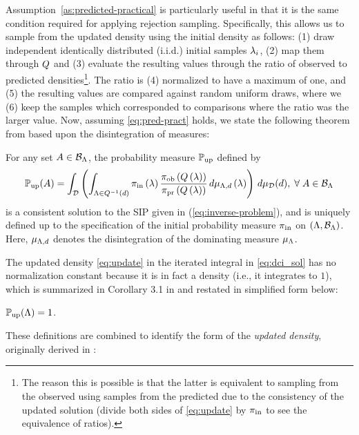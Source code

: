 Assumption~\ref{as:predicted-practical} is particularly useful in that it is the same condition required for applying rejection sampling.
Specifically, this allows us to sample from the updated density using the initial density as follows:
(1) draw independent identically distributed (i.i.d.) initial samples $\lambda_i$, (2) map them through $Q$ and (3) evaluate the resulting values through the ratio of observed to predicted densities\footnote{The reason this is possible is that the latter is equivalent to sampling from the observed using samples from the predicted due to the consistency of the updated solution (divide both sides of \eqref{eq:update} by $\operatorname*{\pi_{in}}$ to see the equivalence of ratios).}. The ratio is (4) normalized to have a maximum of one, and (5) the resulting values are compared against random uniform draws, where we (6) keep the samples which corresponded to comparisons where the ratio was the larger value.
Now, assuming \eqref{eq:pred-pract} holds, we state the following theorem from \cite{BJW18} based upon the disintegration of measures:


\begin{thm}
  For any set $A\in \mathcal{B}_{{\Lambda}}$, the probability measure $\operatorname*{\mathbb{P}_{up}}$ defined by
  \begin{equation}\label{eq:dci_sol}
    \operatorname*{\mathbb{P}_{up}} (A) = \int_{\mathcal{D}} \left (  \int_{{\Lambda} \in Q^{-1}(d)}  \operatorname*{\pi_{in}}\left ( \lambda \right ) \frac{\operatorname*{\pi_{ob}}\left ( Q\left ( \lambda \right ) \right )}{\operatorname*{\pi_{pr}}\left ( Q\left ( \lambda \right ) \right )} \, d\mu_{{\Lambda}, d} \left ( \lambda \right ) \right ) \, d\mu_{\mathcal{D}}(d), \; \forall \; A \in \mathcal{B}_{{\Lambda}}
  \end{equation}
  is a consistent solution to the SIP given in (\ref{eq:inverse-problem}), and is uniquely defined up to the specification of the initial probability measure $\operatorname*{\pi_{in}}$ on $({\Lambda}, \mathcal{B}_{{\Lambda}})$.
  Here, $\mu_{{\Lambda}, d}$ denotes the disintegration of the dominating measure $\mu_{\Lambda}$.
\end{thm}

The updated density \eqref{eq:update} in the iterated integral in \eqref{eq:dci_sol} has no normalization constant because it is in fact a density (i.e., it integrates to $1$), which is summarized in Corollary 3.1 in \cite{BJW18} and restated in simplified form below:
\begin{cor}\label{cor:int}
$\operatorname*{\mathbb{P}_{up}}({\Lambda}) = 1$.
\end{cor}

These definitions are combined to identify the form of the \emph{updated density}, originally derived in \cite{BJW18}:

